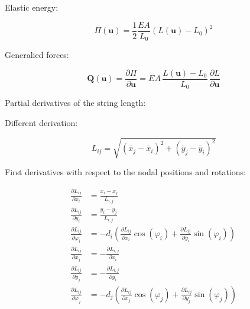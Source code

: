 Elastic energy:

\begin{equation}
\Pi(\boldsymbol{u}) = \frac{1}{2}\frac{EA}{L_{0}}\left(L(\boldsymbol{u}) - L_{0}\right)^2
\end{equation}

Generalied forces:

\begin{equation}
\boldsymbol{Q}(\boldsymbol{u}) = \frac{\partial\Pi}{\partial\boldsymbol{u}} = EA\,\frac{L(\boldsymbol{u}) - L_{0}}{L_{0}}\,\frac{\partial L}{\partial\boldsymbol{u}}
\end{equation}

Partial derivatives of the string length:

\newpage

Different derivation:

\begin{equation}
L_{ij} = \sqrt{(\bar{x}_j - \bar{x}_i)^2 + (\bar{y}_j - \bar{y}_i)^2}
\end{equation}

First derivatives with respect to the nodal positions and rotations:


\begin{align}
\frac{\partial L_{ij}}{\partial x_i} &= \frac{x_i - x_j}{L_{i,j}} \\
\frac{\partial L_{ij}}{\partial y_i} &= \frac{y_i - y_j}{L_{i,j}} \\
\frac{\partial L_{ij}}{\partial \varphi_i} &= -d_{i}\left(\frac{\partial L_{ij}}{\partial x_i}\cos(\varphi_i) + \frac{\partial L_{ij}}{\partial y_i}\sin(\varphi_i)\right)\\
\frac{\partial L_{ij}}{\partial x_j} &= -\frac{\partial L_{i,j}}{\partial x_i} \\
\frac{\partial L_{ij}}{\partial y_j} &= -\frac{\partial L_{i,j}}{\partial y_i} \\
\frac{\partial L_{ij}}{\partial \varphi_j} &= -d_{j}\left(\frac{\partial L_{ij}}{\partial x_j}\cos(\varphi_j) + \frac{\partial L_{ij}}{\partial y_j}\sin(\varphi_j)\right)
\end{align}



